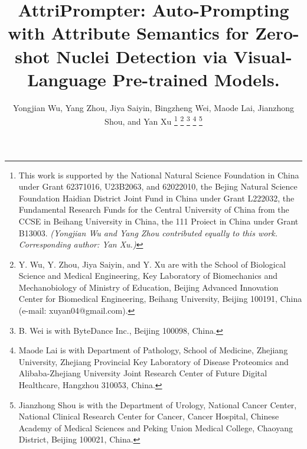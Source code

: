 \documentclass[journal,twoside,web]{ieeecolor}
\begin{document}
\title{AttriPrompter: Auto-Prompting with Attribute Semantics for Zero-shot Nuclei Detection via Visual-Language Pre-trained Models.}
\author{Yongjian Wu, Yang Zhou, Jiya Saiyin, Bingzheng Wei, Maode Lai, Jianzhong Shou, and Yan Xu
	\thanks{This work is supported by the National Natural Science Foundation in China under Grant 62371016, U23B2063, and 62022010, the Bejing Natural Science Foundation Haidian District Joint Fund in China under Grant L222032, the Fundamental Research Funds for the Central University of China from the CCSE in Beihang University in China, the 111 Proiect in China under Grant B13003. \textit{(Yongjian Wu and Yang Zhou contributed equally to this work. Corresponding author: Yan Xu.)}}
	\thanks{Y. Wu, Y. Zhou, Jiya Saiyin, and Y. Xu are with the School of Biological Science and Medical Engineering, Key Laboratory of Biomechanics and Mechanobiology of Ministry of Education, Beijing Advanced Innovation Center for Biomedical Engineering, Beihang University, Beijing 100191, China (e-mail: xuyan04@gmail.com).}
	\thanks{B. Wei is with ByteDance Inc., Beijing 100098, China.} %
	\thanks{Maode Lai is with Department of Pathology, School of Medicine, Zhejiang University, Zhejiang Provincial Key Laboratory of Disease Proteomics and Alibaba-Zhejiang University Joint Research Center of Future Digital Healthcare, Hangzhou 310053, China.} %
    \thanks{Jianzhong Shou is with the Department of Urology, National Cancer Center, National Clinical Research Center for Cancer, Cancer Hospital, Chinese Academy of Medical Sciences and Peking Union Medical College, Chaoyang District, Beijing 100021, China.} %
 }
\maketitle
\end{document}
